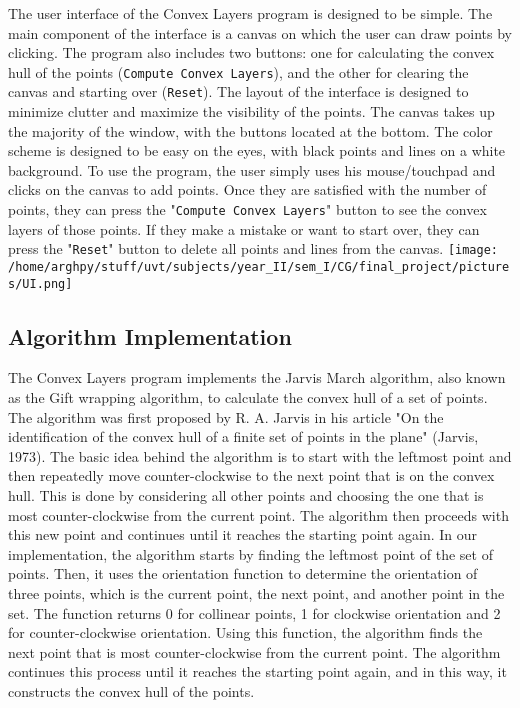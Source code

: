 \documentclass{article}
\begin{document}
The user interface of the Convex Layers program is designed to be simple. The main component of the interface is a canvas on which the user can draw points by clicking. The program also includes two buttons: one for calculating the convex hull of the points (\texttt{Compute Convex Layers}), and the other for clearing the canvas and starting over (\texttt{Reset}).
\newline
\newline
The layout of the interface is designed to minimize clutter and maximize the visibility of the points. The canvas takes up the majority of the window, with the buttons located at the bottom. The color scheme is designed to be easy on the eyes, with black points and lines on a white background.
\newline
\newline
To use the program, the user simply uses his mouse/touchpad and clicks on the canvas to add points. Once they are satisfied with the number of points, they can press the "\texttt{Compute Convex Layers}" button to see the convex layers of those points. If they make a mistake or want to start over, they can press the "\texttt{Reset}" button to delete all points and lines from the canvas.
\newline
\newline
\texttt{[image: /home/arghpy/stuff/uvt/subjects/year\_II/sem\_I/CG/final\_project/pictures/UI.png]}
\newline
\newline
\subsection{Algorithm Implementation}

The Convex Layers program implements the Jarvis March algorithm, also known as the Gift wrapping algorithm, to calculate the convex hull of a set of points. The algorithm was first proposed by R. A. Jarvis in his article "On the identification of the convex hull of a finite set of points in the plane" (Jarvis, 1973)\cite{jarvis_march}.
\newline
\newline
The basic idea behind the algorithm is to start with the leftmost point and then repeatedly move counter-clockwise to the next point that is on the convex hull. This is done by considering all other points and choosing the one that is most counter-clockwise from the current point. The algorithm then proceeds with this new point and continues until it reaches the starting point again.
\newline
\newline
In our implementation, the algorithm starts by finding the leftmost point of the set of points. Then, it uses the orientation function to determine the orientation of three points, which is the current point, the next point, and another point in the set. The function returns 0 for collinear points, 1 for clockwise orientation and 2 for counter-clockwise orientation. Using this function, the algorithm finds the next point that is most counter-clockwise from the current point. The algorithm continues this process until it reaches the starting point again, and in this way, it constructs the convex hull of the points.
\end{document}

